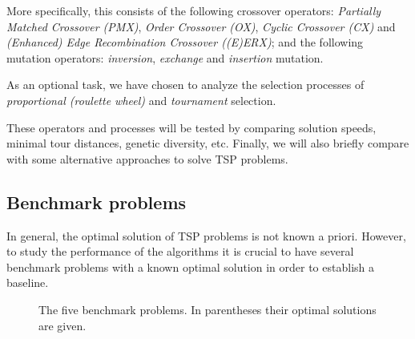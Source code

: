 \documentclass[a4paper,english,11pt,]{scrartcl}
\begin{document}
More specifically, this consists of the following crossover operators: \emph{Partially Matched Crossover (PMX)}, \emph{Order Crossover (OX)}, \emph{Cyclic Crossover (CX)} and \emph{(Enhanced) Edge Recombination Crossover ((E)ERX)}; and the following mutation operators:  \emph{inversion}, \emph{exchange} and \emph{insertion} mutation. 

As an optional task, we have chosen to analyze the selection processes of \emph{proportional (roulette wheel)} and \emph{tournament} selection. 

These operators and processes will be tested by comparing solution speeds, minimal tour distances, genetic diversity, etc.
Finally, we will also briefly compare with some alternative approaches to solve TSP problems.

\subsection{Benchmark problems}
In general, the optimal solution of TSP problems is not known a priori. However, to study the performance of the algorithms it is crucial to have several benchmark problems with a known optimal solution in order to establish a baseline.


\begin{figure}[hbtp]
\centering
{} \vspace{0.5cm}
                \vspace{0.5cm}

 \vspace{0.5cm}
\caption[The five benchmark problems.]{The five benchmark problems. In parentheses their optimal solutions are given.}
\label{fig:datasets}
\end{figure}
\end{document}
